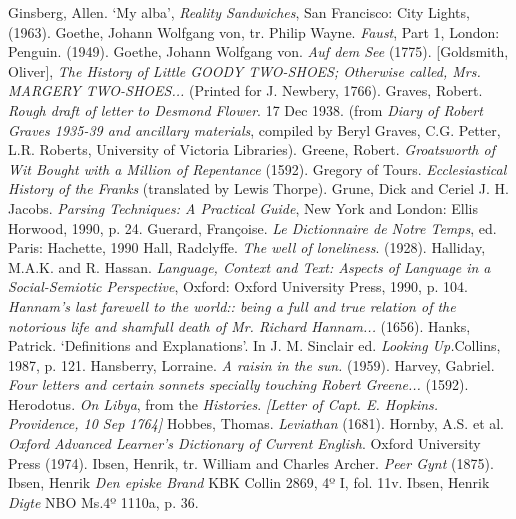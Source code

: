 \begin{bibitemlist}{1}
 Ginsberg, Allen. ‘My alba’, \textit{Reality Sandwiches}, San Francisco: City Lights, (1963).
 Goethe, Johann Wolfgang von, tr. Philip Wayne. \textit{Faust}, Part 1, London: Penguin. (1949).
 Goethe, Johann Wolfgang von. \textit{Auf dem See} (1775).
 [Goldsmith, Oliver], \textit{The History of Little GOODY TWO-SHOES; Otherwise called, Mrs. MARGERY TWO-SHOES...} (Printed for J. Newbery, 1766).
 Graves, Robert. \textit{Rough draft of letter to Desmond Flower}. 17 Dec 1938. (from \textit{Diary of Robert Graves 1935-39 and ancillary materials}, compiled by Beryl Graves, C.G. Petter, L.R. Roberts, University of Victoria Libraries).
 Greene, Robert. \textit{Groatsworth of Wit Bought with a Million of Repentance} (1592).
 Gregory of Tours. \textit{Ecclesiastical History of the Franks} (translated by Lewis Thorpe).
 Grune, Dick and Ceriel J. H. Jacobs. \textit{Parsing Techniques: A Practical Guide}, New York and London: Ellis Horwood, 1990, p. 24.
 Guerard, Françoise. \textit{Le Dictionnaire de Notre Temps}, ed. Paris: Hachette, 1990
 Hall, Radclyffe. \textit{The well of loneliness}. (1928).
 Halliday, M.A.K.  and R. Hassan. \textit{Language, Context and Text: Aspects of Language in a Social-Semiotic Perspective}, Oxford: Oxford University Press, 1990, p. 104.
 \textit{Hannam's last farewell to the world:: being a full and true relation of the notorious life and shamfull death of Mr. Richard Hannam...} (1656).
 Hanks, Patrick. ‘Definitions and Explanations’. In J. M. Sinclair ed. \textit{Looking Up.}Collins, 1987, p. 121.
 Hansberry, Lorraine. \textit{A raisin in the sun.} (1959).
 Harvey, Gabriel. \textit{Four letters and certain sonnets specially touching Robert Greene...} (1592).
 Herodotus. \textit{On Libya}, from the \textit{Histories}.
 \textit{[Letter of Capt. E. Hopkins. Providence, 10 Sep 1764]}
 Hobbes, Thomas. \textit{Leviathan} (1681).
 Hornby, A.S. et al. \textit{Oxford Advanced Learner's Dictionary of Current English}. Oxford University Press (1974).
 Ibsen, Henrik, tr. William and Charles Archer. \textit{Peer Gynt} (1875).
 Ibsen, Henrik \textit{Den episke Brand} KBK Collin 2869, 4º I, fol. 11v.
 Ibsen, Henrik \textit{Digte} NBO Ms.4º 1110a, p. 36.

\end{bibitemlist}
